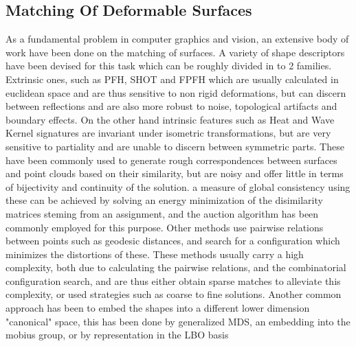 \documentclass[10pt,twocolumn,letterpaper]{article}
\begin{document}
\subsection{Matching Of Deformable Surfaces}
As a fundamental problem in computer graphics and vision, an extensive body of work have been done on the matching of surfaces.
A variety of shape descriptors have been devised for this task which can be roughly divided in to 2 families. 
Extrinsic ones, such as PFH\cite{rusu2008learning}, SHOT\cite{tombari2010unique} and FPFH\cite{rusu2009fast} which are usually calculated in euclidean space and are thus sensitive to non rigid deformations, but can discern between reflections and are also more robust to noise, topological artifacts and boundary effects.
On the other hand intrinsic features such as Heat\cite{bronstein2010scale} and Wave Kernel signatures\cite{aubry2011wave} are invariant under isometric transformations, but are very sensitive to partiality and are unable to discern between symmetric parts.
These have been commonly used to generate rough correspondences between surfaces and point clouds based on their similarity, but are noisy and offer little in terms of bijectivity and continuity of the solution. a measure of global consistency using these can be achieved by solving an energy minimization of the disimilarity matrices steming from an assignment, and the auction algorithm has been commonly employed for this purpose.
Other methods use pairwise relations between points such as geodesic distances\cite{sahilliouglu2012minimum,sahilliouglu2012scale,sahillioglu2011coarse}, and search for a configuration which minimizes the distortions of these. These methods usually carry a high complexity, both due to calculating the pairwise relations, and the combinatorial configuration search, and are thus either obtain sparse matches\cite{sahilliouglu2012minimum,sahilliouglu2012scale,sahillioglu2011coarse} to alleviate this complexity, or used strategies such as coarse to fine solutions.
Another common approach has been to embed the shapes into a different lower dimension "canonical"  space, this has been done by generalized MDS\cite{bronstein2006generalized}, an embedding into the mobius group\cite{lipman2009mobius}, or by representation in the LBO basis\cite{shtern2014matching}
\end{document}
